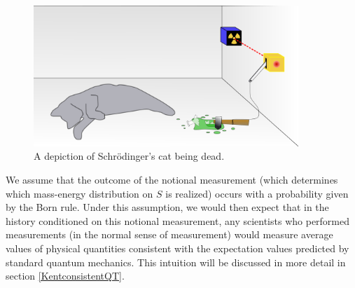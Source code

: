  \begin{figure}[ht!]
    \captionsetup{justification=justified}
    \centering
    \includegraphics[width=100mm]{Chapter03/Schrodingers_deadcat.png}
    \caption[Caption for LOF]{A depiction of Schr\"{o}dinger's cat being dead.\protect\footnotemark}
    \label{deadcat}
    \end{figure}
    We assume that the outcome of the notional measurement (which determines which mass-energy distribution on $S$ is realized) occurs with a probability given by the Born rule. Under this assumption, we would then expect that in the history conditioned on this notional measurement, any scientists who performed measurements (in the normal sense of measurement) would measure average values of physical quantities consistent with the expectation values predicted by standard quantum mechanics. This intuition will be discussed in more detail in section \ref{KentconsistentQT}.
    

